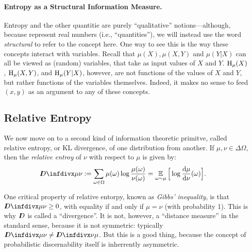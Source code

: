 \paragraph{Entropy as a Structural Information Measure.} 
Entropy and 
the other quantitie 
are purely ``qualitative'' notions---although, because represent real numbers (i.e., ``quantities''), we will instead use the word \emph{structural} to refer to the concept here.
One way to see this is the way these concepts interact with variables. 
Recall that $\mu(X), \mu(X,Y)$ and $\mu(Y|X)$ can all be viewed as (random) variables, that take as input values of $X$ and $Y$. 
$\operatorname{\mathrm{H}}_\mu(X)$, $\operatorname{\mathrm{H}}_\mu(X,Y)$, and $\operatorname{\mathrm{H}}_\mu(Y|X)$, however, 
    are not functions of the values of $X$ and $Y$, but rather functions 
    of the variables themselves. 
Indeed, it makes no sense to feed $(x,y)$ as an argument to any of these concepts. 



\subsection{Relative Entropy}
    \label{sec:relent-primer}

We now move on to a second kind of information theoretic primitve, called relative entropy, or KL divergence, of one distribution from another. If $\mu, \nu \in \Delta \Omega$, then the \emph{relative entroy} of $\nu$ with respect to $\mu$ is given by:
%
\begin{align*}
    \kldiv {\mu} {\nu} 
    &:= \sum_{ \omega \in \Omega } \mu(\omega) \log \frac{ \mu(\omega) }{ \nu(\omega) }
    = \Ex_{\omega \sim \mu} \Big[ \log \frac{\mathrm d \mu}{\mathrm d \nu}(\omega) \Big].
\end{align*}

One critical property of relative entorpy, known as \emph{Gibbs' inequality}, is that
$\kldiv{\mu}{\nu} \ge 0$,
with equality if and only if $\mu = \nu$ (with probability 1). 
This is why $I\mkern-8muD$ is called a ``divergence''. 
It is not, however, a ``distance measure'' in the standard sense, because it is not symmetric: typically $\kldiv{\mu}{\nu} \ne \kldiv{\nu}{\mu}$. 
%
But this is a good thing, because the concept of probabilistic discernability itself is inherrently asymmetric. 

